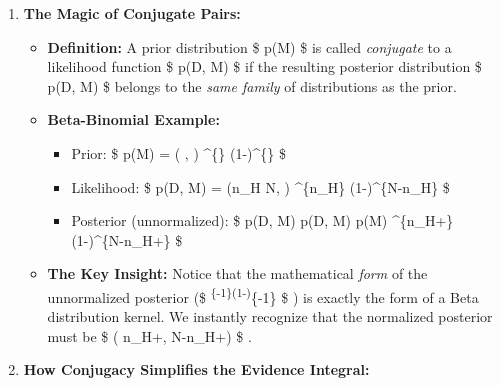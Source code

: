 \documentclass[11pt]{article}
\providecommand{\tightlist}{%
      \setlength{\itemsep}{0pt}\setlength{\parskip}{0pt}}
\begin{document}
    \begin{enumerate}
\def\labelenumi{\arabic{enumi}.}
\tightlist
\item
  \textbf{The Magic of Conjugate Pairs:}

  \begin{itemize}
  \tightlist
  \item
    \textbf{Definition:} A prior distribution \$ p(\theta\textbar M) \$
    is called \emph{conjugate} to a likelihood function \$
    p(D\textbar{}\theta, M) \$ if the resulting posterior distribution
    \$ p(\theta\textbar D, M) \$ belongs to the \emph{same family} of
    distributions as the prior.
  \item
    \textbf{Beta-Binomial Example:}

    \begin{itemize}
    \tightlist
    \item
      Prior: \$ p(\theta\textbar M) = (\theta \textbar{}
      \alpha, \beta) \propto \theta\^{}\{\}
      (1-\theta)\^{}\{\} \$
    \item
      Likelihood: \$ p(D\textbar{}\theta, M) = (n\_H
      \textbar{} N, \theta) \propto \theta\^{}\{n\_H\}
      (1-\theta)\^{}\{N-n\_H\} \$
    \item
      Posterior (unnormalized): \$ p(\theta\textbar D, M)
      \propto p(D\textbar{}\theta, M) p(\theta\textbar M)
      \propto \theta\^{}\{n\_H+\}
      (1-\theta)\^{}\{N-n\_H+\} \$
    \end{itemize}
  \item
    \textbf{The Key Insight:} Notice that the mathematical \emph{form}
    of the unnormalized posterior (\$
    \theta\textsuperscript{\{-1\}(1-\theta)}\{-1\}
    \$ ) is exactly the form of a Beta distribution kernel. We instantly
    recognize that the normalized posterior must be \$
    (\theta \textbar{} n\_H+\alpha, N-n\_H+\beta) \$ .
  \end{itemize}
\item
  \textbf{How Conjugacy Simplifies the Evidence Integral:}


\end{enumerate}
\end{document}
